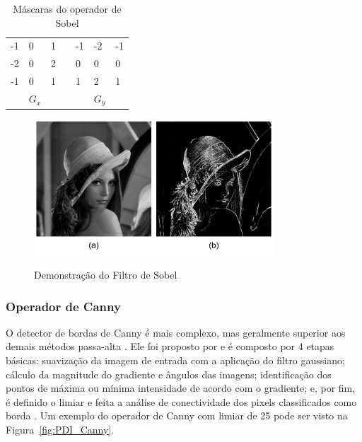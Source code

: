 \documentclass[12pt,oneside,a4paper,english,french,spanish,brazil,]{abntex2}
\begin{document}
\begin{table}
\centering
\caption{Máscaras do operador de Sobel}
\label{tab:Sobel}
\begin{tabular}{lllllll}
\cline{1-3} \cline{5-7}
\multicolumn{1}{|l|}{-1} & \multicolumn{1}{l|}{0} & \multicolumn{1}{l|}{1} & \multicolumn{1}{l|}{} & \multicolumn{1}{l|}{-1} & \multicolumn{1}{l|}{-2} & \multicolumn{1}{l|}{-1} \\ \cline{1-3} \cline{5-7} 
\multicolumn{1}{|l|}{-2} & \multicolumn{1}{l|}{0} & \multicolumn{1}{l|}{2} & \multicolumn{1}{l|}{} & \multicolumn{1}{l|}{0}  & \multicolumn{1}{l|}{0}  & \multicolumn{1}{l|}{0}  \\ \cline{1-3} \cline{5-7} 
\multicolumn{1}{|l|}{-1} & \multicolumn{1}{l|}{0} & \multicolumn{1}{l|}{1} & \multicolumn{1}{l|}{} & \multicolumn{1}{l|}{1}  & \multicolumn{1}{l|}{2}  & \multicolumn{1}{l|}{1}  \\ \cline{1-3} \cline{5-7} 
                         & \(G_x\)                   &                        &                       &                         & \(G_y\)                    &                        
\end{tabular}
\end{table}

\begin{figure}[ht]
\centering
\caption{Demonstração do Filtro de Sobel}
\includegraphics[width=0.8\textwidth]{imagens/PDI_Sobel.pdf}
\sourceAuthor
\label{fig:PDI_Sobel}
\end{figure}

\subsubsection{Operador de Canny}

O detector de bordas de Canny é mais complexo, mas geralmente superior aos demais métodos passa-alta \cite{gonzalez:2012}. Ele foi proposto por \citet{canny:1987} e é composto por 4 etapas básicas: suavização da imagem de entrada com a aplicação do filtro gaussiano; cálculo da magnitude do gradiente e ângulos das imagens; identificação dos pontos de máxima ou mínima intensidade de acordo com o gradiente; e, por fim, é definido o limiar e feita a análise de conectividade dos pixels classificados como borda \cite{gonzalez:2012}. Um exemplo do operador de Canny com limiar de 25 pode ser visto na Figura~\ref{fig:PDI_Canny}.
\end{document}

